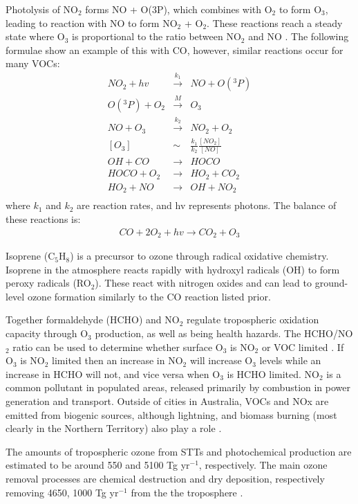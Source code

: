 Photolysis of NO$_2$ forms NO + O(3P), which combines with O$_2$ to form O$_3$, leading to reaction with NO to form NO$_2$ + O$_2$.
These reactions reach a steady state where O$_3$ is proportional to the ratio between NO$_2$ and NO \cite{Sillman_2002}.
The following formulae show an example of this with CO, however, similar reactions occur for many VOCs:
\begin{eqnarray*}
NO_2 + hv &\overset{k_1}{\rightarrow}& NO + O({}^3 P) \\
O({}^3 P) + O_2 &\overset{M}{\rightarrow}& O_3 \\
NO + O_3 &\overset{k_2}{\rightarrow}& NO_2 + O_2 \\
\left[O_3\right] &\sim& \frac{k_1}{k_2} \frac{\left[NO_2\right]}{\left[NO\right]} \\
OH + CO &{\rightarrow}& HOCO \\
HOCO + O_2 &{\rightarrow}& HO_2 + CO_2 \\
HO_2 + NO &{\rightarrow}& OH + NO_2 \\
\end{eqnarray*}
where $k_1$ and $k_2$ are reaction rates, and hv represents photons.
The balance of these reactions is:
\begin{eqnarray*} CO + 2O_2 + hv {\rightarrow} CO_2 + O_3 \end{eqnarray*}

Isoprene (C$_5$H$_8$) is a precursor to ozone through radical oxidative chemistry. Isoprene in the atmosphere reacts rapidly with hydroxyl radicals (OH) to form peroxy radicals (RO$_2$).
These react with nitrogen oxides and can lead to ground-level ozone formation similarly to the CO reaction listed prior.

Together formaldehyde (HCHO) and NO$_2$ regulate tropospheric oxidation capacity through O$_3$ production, as well as being health hazards.
The HCHO/NO$_2$ ratio can be used to determine whether surface O$_3$ is NO$_2$ or VOC limited \cite{Mahajan_2015}.
If O$_3$ is NO$_2$ limited then an increase in NO$_2$ will increase O$_3$ levels while an increase in HCHO will not, and vice versa when O$_3$ is HCHO limited.
NO$_2$ is a common pollutant in populated areas, released primarily by combustion in power generation and transport. 
Outside of cities in Australia, VOCs and NOx are emitted from biogenic sources, although lightning, and biomass burning (most clearly in the Northern Territory) also play a role \cite{Guenther_2006, VanDerA_2008}.

The amounts of tropospheric ozone from STTs and photochemical production are estimated to be around 550 and 5100 Tg yr$^{-1}$, respectively. 
The main ozone removal processes are chemical destruction and dry deposition, respectively removing 4650, 1000 Tg yr$^{-1}$ from the the troposphere \cite{Stevenson_2006}.